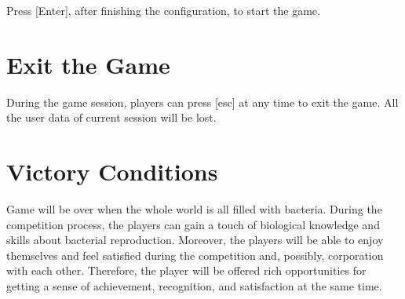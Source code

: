 \documentclass[12pt,a4paper]{scrartcl}
\begin{document}
Press [Enter], after finishing the configuration, to start the game.
\section{Exit the Game}
During the game session, players can press [esc] at any time to exit the game. All the user data of current session will be lost.

\section{Victory Conditions}
Game will be over when the whole world is all filled with bacteria. During the competition process, the players can gain a touch of biological knowledge and skills about bacterial reproduction. Moreover, the players will be able to enjoy themselves and feel satisfied during the competition and, possibly, corporation with each other. Therefore, the player will be offered rich opportunities for getting a sense of achievement, recognition, and satisfaction at the same time.
\end{document}
